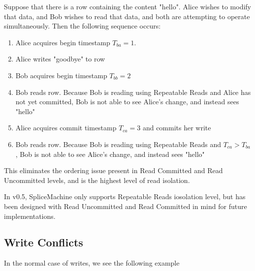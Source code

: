 \begin{exmp}
				Suppose that there is a row containing the content "hello". Alice wishes to modify that data, and Bob wishes to read that data, and both are attempting to operate simultaneously. Then the following sequence occurs:
				\begin{enumerate}
					\item Alice acquires begin timestamp $T_{ba} = 1$.
					\item Alice writes "goodbye" to row
					\item Bob acquires begin timestamp $T_{bb} = 2$
					\item Bob reads row. Because Bob is reading using Repeatable Reads and Alice has not yet committed, Bob is not able to see Alice's change, and instead sees "hello"
					\item Alice acquires commit timestamp $T_{ca} = 3$ and commits her write	
					\item Bob reads row. Because Bob is reading using Repeatable Reads and $T_{ca} > T_{ba}$, Bob is not able to see Alice's change, and instead sees "hello"
				\end{enumerate}
\end{exmp}
This eliminates the ordering issue present in Read Committed and Read Uncommitted levels, and is the highest level of read isolation.

In v0.5, SpliceMachine only supports Repeatable Reads iosolation level, but has been designed with Read Uncommitted and Read Committed in mind for future implementations.

\subsection{Write Conflicts}
In the normal case of writes, we see the following example

